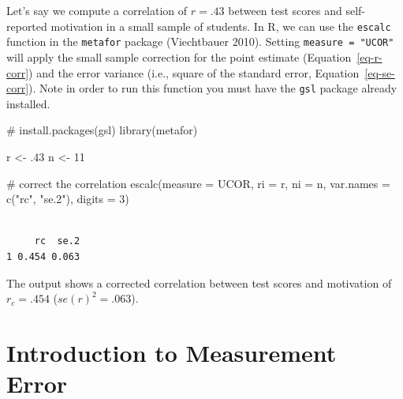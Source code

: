 \documentclass[
  letterpaper,
  DIV=11,
  numbers=noendperiod]{scrreprt}
\newenvironment{Shaded}{}{}
\newcommand{\AttributeTok}[1]{\textcolor[rgb]{0.00,0.34,0.68}{#1}}
\newcommand{\CommentTok}[1]{\textcolor[rgb]{0.54,0.53,0.53}{#1}}
\newcommand{\DecValTok}[1]{\textcolor[rgb]{0.69,0.50,0.00}{#1}}
\newcommand{\FunctionTok}[1]{\textcolor[rgb]{0.39,0.29,0.61}{#1}}
\newcommand{\NormalTok}[1]{\textcolor[rgb]{0.12,0.11,0.11}{#1}}
\newcommand{\OtherTok}[1]{\textcolor[rgb]{0.00,0.43,0.16}{#1}}
\newcommand{\StringTok}[1]{\textcolor[rgb]{0.75,0.01,0.01}{#1}}
\begin{document}
\begin{tcolorbox}[enhanced jigsaw, opacityback=0, coltitle=black, toprule=.15mm, colframe=quarto-callout-note-color-frame, bottomtitle=1mm, rightrule=.15mm, colbacktitle=quarto-callout-note-color!10!white, left=2mm, bottomrule=.15mm, breakable, title={Applied Example in R}, colback=white, opacitybacktitle=0.6, titlerule=0mm, arc=.35mm, leftrule=.75mm, toptitle=1mm]

Let's say we compute a correlation of \(r=.43\) between test scores and
self-reported motivation in a small sample of students. In R, we can use
the \texttt{escalc} function in the \texttt{metafor} package
(Viechtbauer 2010). Setting \texttt{measure\ =\ "UCOR"} will apply the
small sample correction for the point estimate
(Equation~\ref{eq-r-corr}) and the error variance (i.e., square of the
standard error, Equation~\ref{eq-se-corr}). Note in order to run this
function you must have the \texttt{gsl} package already installed.

\begin{Shaded}
\begin{Highlighting}[]
\CommentTok{\# install.packages(\textquotesingle{}gsl\textquotesingle{})}
\FunctionTok{library}\NormalTok{(metafor)}

\NormalTok{r }\OtherTok{\textless{}{-}}\NormalTok{ .}\DecValTok{43}
\NormalTok{n }\OtherTok{\textless{}{-}} \DecValTok{11}

\CommentTok{\# correct the correlation}
\FunctionTok{escalc}\NormalTok{(}\AttributeTok{measure =} \StringTok{\textquotesingle{}UCOR\textquotesingle{}}\NormalTok{,}
       \AttributeTok{ri =}\NormalTok{ r,}
       \AttributeTok{ni =}\NormalTok{ n,}
       \AttributeTok{var.names =} \FunctionTok{c}\NormalTok{(}\StringTok{"rc"}\NormalTok{, }\StringTok{"se.2"}\NormalTok{),}
       \AttributeTok{digits =} \DecValTok{3}\NormalTok{)}
\end{Highlighting}
\end{Shaded}

\begin{verbatim}

     rc  se.2 
1 0.454 0.063 
\end{verbatim}

The output shows a corrected correlation between test scores and
motivation of \(r_c=.454\) (\(se(r)^2=.063\)).

\end{tcolorbox}


\chapter{Introduction to Measurement
Error}\label{introduction-to-measurement-error}
\end{document}
